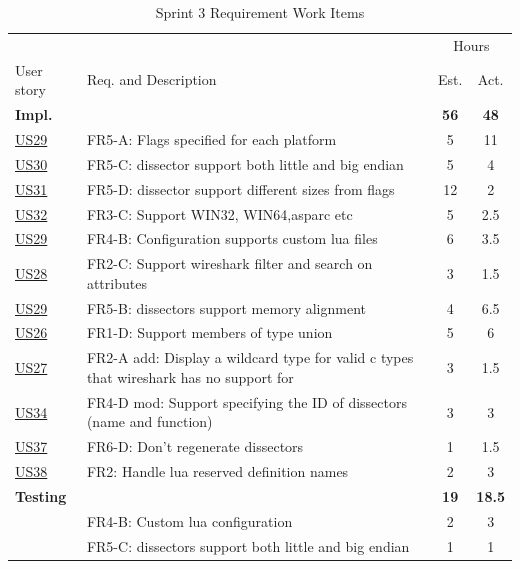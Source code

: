 \begin{table}[!htb] \small \center
\caption{Sprint 3 Requirement Work Items \label{tab:sprint3req}}
\begin{tabularx}{\textwidth}{l X c c}
	\toprule
	& & \multicolumn{2}{c}{Hours} \\
	\cmidrule(r){3-4}
	User story & Req. and Description & Est. & Act. \\
	\midrule
	\textbf{Impl.} &  & \textbf{56} & \textbf{48} \\
	\hyperref[tab:req:stories7]{US29} & FR5-A: Flags specified for each platform &  5  & 11 \\
	\hyperref[tab:req:stories8]{US30} & FR5-C: \Gls{dissector} support both little and big \gls{endian} & 5  & 4 \\
	\hyperref[tab:req:stories8]{US31} & FR5-D: \Gls{dissector} support different sizes from flags & 12  & 2 \\
	\hyperref[tab:req:stories8]{US32} & FR3-C: Support WIN32, WIN64,\gls{asparc} etc &  5  & 2.5 \\
	\hyperref[tab:req:stories7]{US29} & FR4-B: Configuration supports custom \Gls{lua} files & 6 & 3.5\\
	\hyperref[tab:req:stories7]{US28} & FR2-C: Support \Gls{wireshark} filter and search on attributes &  3 & 1.5\\
	\hyperref[tab:req:stories7]{US29} & FR5-B: \Glspl{dissector} support memory alignment & 4 & 6.5\\
	\hyperref[tab:req:stories7]{US26} & FR1-D: Support \glspl{member} of type \gls{union} & 5  & 6\\
	\hyperref[tab:req:stories7]{US27} & FR2-A add: Display a \gls{wildcard} type for valid \Gls{c} types that \Gls{wireshark} has no support for & 3  & 1.5\\
	\hyperref[tab:req:stories9]{US34} & FR4-D mod: Support specifying the ID of \glspl{dissector} (name and function) & 3  & 3 \\
	\hyperref[tab:req:stories9]{US37} & FR6-D: Don’t regenerate \glspl{dissector} & 1 & 1.5\\
	\hyperref[tab:req:stories7]{US38} & FR2: Handle \Gls{lua} reserved definition names & 2 & 3 \\
	\addlinespace
	\textbf{Testing} &  & \textbf{19} & \textbf{18.5} \\
	 & FR4-B: Custom \Gls{lua} configuration & 2 & 3\\
	 & FR5-C: \Glspl{dissector} support both little and big \gls{endian} & 1 & 1 \\

\end{tabularx}
\end{table}
